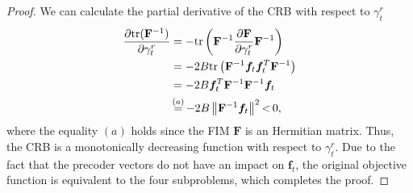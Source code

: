 \documentclass[twocolumn,journal]{IEEEtran}
\begin{document}
\begin{proof}
 We can calculate the partial derivative of the CRB with respect to \(\gamma_{t}^{r}\)
    \begin{align}
 \frac{\partial \text{tr}(\mathbf{F}^{-1})}{\partial \gamma_{t}^{r}} &= -\text{tr}\left(\mathbf{F}^{-1} \frac{\partial \mathbf{F}}{\partial \gamma_{t}^{r}} \mathbf{F}^{-1} \right)\notag\\
        &= -2B\text{tr}\left(\mathbf{F}^{-1} \boldsymbol{f}_{t}\boldsymbol{f}^{T}_{t} \mathbf{F}^{-1} \right) \notag\\
        &= -2B\boldsymbol{f}^{T}_{t} \mathbf{F}^{-1}\mathbf{F}^{-1} \boldsymbol{f}_{t} \notag\\
        &\mathop{=}^{(a)}-2B\left\Vert \mathbf{F}^{-1} \boldsymbol{f}_{t} \right\Vert^2 \mathop{<} 0,
    \end{align}
 where the equality \((a)\) holds since the FIM \(\mathbf{F}\) is an Hermitian matrix. Thus, the CRB is a monotonically decreasing function with respect to \(\gamma_{t}^{r}\). Due to the fact that the precoder vectors do not have an impact on \(\boldsymbol{f}_t\), the original objective function is equivalent to the four subproblems, which completes the proof.
\end{proof}
\end{document}
